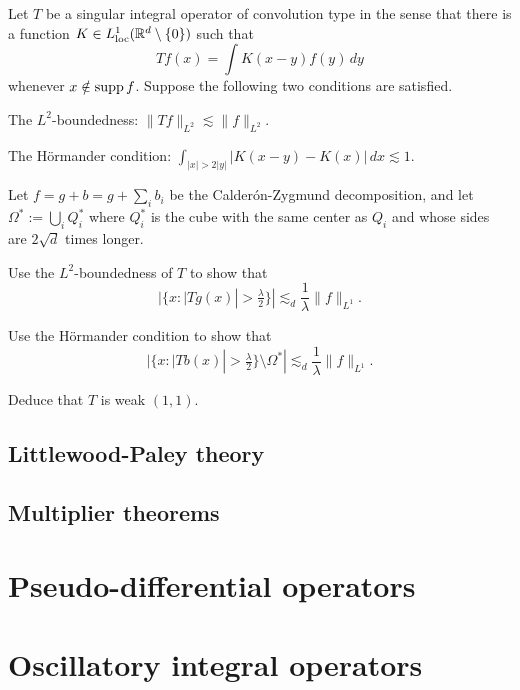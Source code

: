 \documentclass{../note}
\begin{document}
\begin{prb}
Let $T$ be a singular integral operator of convolution type in the sense that there is a function $K\in L_{\mathrm{loc}}^1(\mathbb{R}^d\setminus\{0\})$ such that
\[Tf(x)=\int K(x-y)f(y)\,dy\]
whenever $x\notin\operatorname{supp} f$.
Suppose the following two conditions are satisfied.
\begin{parts}[(i)]
\item
The $L^2$-boundedness: $\|Tf\|_{L^2}\lesssim\|f\|_{L^2}$.
\item
The H\"ormander condition: $\int_{|x|>2|y|}|K(x-y)-K(x)|\,dx\lesssim1$.
\end{parts}
Let $f=g+b=g+\sum_ib_i$ be the Calder\'on-Zygmund decomposition, and let $\Omega^*:=\bigcup_iQ_i^*$ where $Q_i^*$ is the cube with the same center as $Q_i$ and whose sides are $2\sqrt d$ times longer. 
\begin{parts}
\item
Use the $L^2$-boundedness of $T$ to show that
\[|\{x:|Tg(x)|>\tfrac\lambda2\}|\lesssim_d\frac1\lambda\|f\|_{L^1}.\]
\item
Use the H\"ormander condition to show that
\[|\{x:|Tb(x)|>\tfrac\lambda2\}\setminus\Omega^*|\lesssim_d\frac1\lambda\|f\|_{L^1}.\]
\item
Deduce that $T$ is weak $(1,1)$.
\end{parts}
\end{prb}



\chapter{Littlewood-Paley theory}
\chapter{Multiplier theorems}

\part{Pseudo-differential operators}


\part{Oscillatory integral operators}
\end{document}
